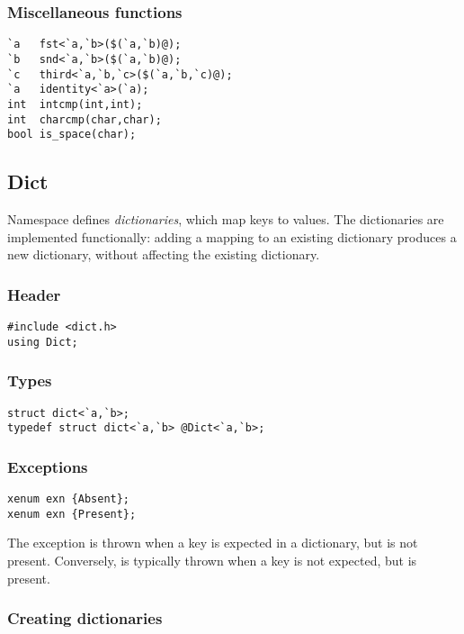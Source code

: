 \subsubsection*{Miscellaneous functions}
\begin{verbatim}
`a   fst<`a,`b>($(`a,`b)@);
`b   snd<`a,`b>($(`a,`b)@);
`c   third<`a,`b,`c>($(`a,`b,`c)@);
`a   identity<`a>(`a);
int  intcmp(int,int);
int  charcmp(char,char);
bool is_space(char);
\end{verbatim}

\subsection{Dict}

Namespace  defines \emph{dictionaries}, which map keys to
values.  The dictionaries are implemented functionally: adding a mapping
to an existing dictionary produces a new dictionary, without affecting
the existing dictionary.

\subsubsection*{Header}
\begin{verbatim}
#include <dict.h>
using Dict;
\end{verbatim}

\subsubsection*{Types}
\begin{verbatim}
struct dict<`a,`b>;
typedef struct dict<`a,`b> @Dict<`a,`b>;
\end{verbatim}

\subsubsection*{Exceptions}
\begin{verbatim}
xenum exn {Absent};
xenum exn {Present};
\end{verbatim}

The exception  is thrown when a key is expected in a
dictionary, but is not present.  Conversely,  is
typically thrown when a key is not expected, but is present.


\subsubsection*{Creating dictionaries}

